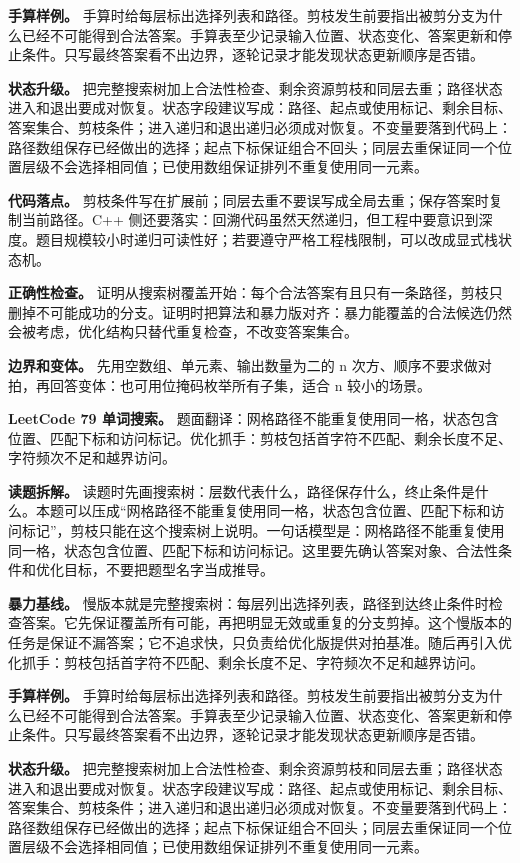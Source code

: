 \textbf{手算样例。} 手算时给每层标出选择列表和路径。剪枝发生前要指出被剪分支为什么已经不可能得到合法答案。手算表至少记录输入位置、状态变化、答案更新和停止条件。只写最终答案看不出边界，逐轮记录才能发现状态更新顺序是否错。

\textbf{状态升级。} 把完整搜索树加上合法性检查、剩余资源剪枝和同层去重；路径状态进入和退出要成对恢复。状态字段建议写成：路径、起点或使用标记、剩余目标、答案集合、剪枝条件；进入递归和退出递归必须成对恢复。不变量要落到代码上：路径数组保存已经做出的选择；起点下标保证组合不回头；同层去重保证同一个位置层级不会选择相同值；已使用数组保证排列不重复使用同一元素。

\textbf{代码落点。} 剪枝条件写在扩展前；同层去重不要误写成全局去重；保存答案时复制当前路径。C++ 侧还要落实：回溯代码虽然天然递归，但工程中要意识到深度。题目规模较小时递归可读性好；若要遵守严格工程栈限制，可以改成显式栈状态机。

\textbf{正确性检查。} 证明从搜索树覆盖开始：每个合法答案有且只有一条路径，剪枝只删掉不可能成功的分支。证明时把算法和暴力版对齐：暴力能覆盖的合法候选仍然会被考虑，优化结构只替代重复检查，不改变答案集合。

\textbf{边界和变体。} 先用空数组、单元素、输出数量为二的 n 次方、顺序不要求做对拍，再回答变体：也可用位掩码枚举所有子集，适合 n 较小的场景。

\noindent\textbf{LeetCode 79 单词搜索。} 题面翻译：网格路径不能重复使用同一格，状态包含位置、匹配下标和访问标记。优化抓手：剪枝包括首字符不匹配、剩余长度不足、字符频次不足和越界访问。

\textbf{读题拆解。} 读题时先画搜索树：层数代表什么，路径保存什么，终止条件是什么。本题可以压成“网格路径不能重复使用同一格，状态包含位置、匹配下标和访问标记”，剪枝只能在这个搜索树上说明。一句话模型是：网格路径不能重复使用同一格，状态包含位置、匹配下标和访问标记。这里要先确认答案对象、合法性条件和优化目标，不要把题型名字当成推导。

\textbf{暴力基线。} 慢版本就是完整搜索树：每层列出选择列表，路径到达终止条件时检查答案。它先保证覆盖所有可能，再把明显无效或重复的分支剪掉。这个慢版本的任务是保证不漏答案；它不追求快，只负责给优化版提供对拍基准。随后再引入优化抓手：剪枝包括首字符不匹配、剩余长度不足、字符频次不足和越界访问。

\textbf{手算样例。} 手算时给每层标出选择列表和路径。剪枝发生前要指出被剪分支为什么已经不可能得到合法答案。手算表至少记录输入位置、状态变化、答案更新和停止条件。只写最终答案看不出边界，逐轮记录才能发现状态更新顺序是否错。

\textbf{状态升级。} 把完整搜索树加上合法性检查、剩余资源剪枝和同层去重；路径状态进入和退出要成对恢复。状态字段建议写成：路径、起点或使用标记、剩余目标、答案集合、剪枝条件；进入递归和退出递归必须成对恢复。不变量要落到代码上：路径数组保存已经做出的选择；起点下标保证组合不回头；同层去重保证同一个位置层级不会选择相同值；已使用数组保证排列不重复使用同一元素。

